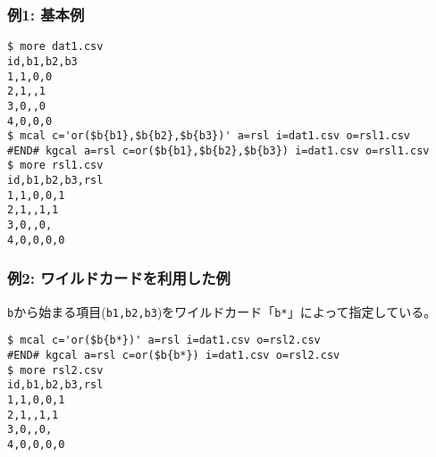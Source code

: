 \subsubsection*{例1: 基本例}



\begin{Verbatim}[baselinestretch=0.7,frame=single]
$ more dat1.csv
id,b1,b2,b3
1,1,0,0
2,1,,1
3,0,,0
4,0,0,0
$ mcal c='or($b{b1},$b{b2},$b{b3})' a=rsl i=dat1.csv o=rsl1.csv
#END# kgcal a=rsl c=or($b{b1},$b{b2},$b{b3}) i=dat1.csv o=rsl1.csv
$ more rsl1.csv
id,b1,b2,b3,rsl
1,1,0,0,1
2,1,,1,1
3,0,,0,
4,0,0,0,0
\end{Verbatim}
\subsubsection*{例2: ワイルドカードを利用した例}

\verb|b|から始まる項目(\verb|b1,b2,b3|)をワイルドカード「\verb|b*|」によって指定している。


\begin{Verbatim}[baselinestretch=0.7,frame=single]
$ mcal c='or($b{b*})' a=rsl i=dat1.csv o=rsl2.csv
#END# kgcal a=rsl c=or($b{b*}) i=dat1.csv o=rsl2.csv
$ more rsl2.csv
id,b1,b2,b3,rsl
1,1,0,0,1
2,1,,1,1
3,0,,0,
4,0,0,0,0
\end{Verbatim}
